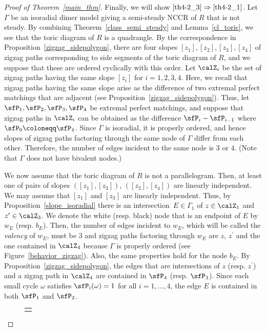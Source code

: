 \begin{proof}[Proof of Theorem~\ref{main_thm}]
Finally, we will show $\eqref{th4-2_3}\Rightarrow\eqref{th4-2_1}$.
Let $\Gamma$ be an isoradial dimer model giving a semi-steady NCCR of $R$ that is not steady. By combining Theorem~\ref{class_semi_steady} and Lemma~\ref{cl_toric}, we see that the toric diagram of $R$ is a quadrangle. By the correspondence in Proposition~\ref{zigzag_sidepolygon}, there are four slopes $[z_1], [z_2],[z_3], [z_4]$ of zigzag paths corresponding to side segments of the toric diagram of $R$, and we suppose that these are ordered cyclically with this order. Let $\calZ_i$ be the set of zigzag paths having the same slope $[z_i]$ for $i=1,2,3,4$. Here, we recall that zigzag paths having the same slope arise as the difference of two extremal perfect matchings that are adjacent (see Proposition~\ref{zigzag_sidepolygon}). Thus, let $\sfP_1,\sfP_2, \sfP_3, \sfP_4$ be extremal perfect matchings, and suppose that zigzag paths in $\calZ_i$ can be obtained as the difference $\sfP_i-\sfP_{i-1}$ where $\sfP_0\coloneqq\sfP_4$. Since $\Gamma$ is isoradial, it is properly ordered, and hence slopes of zigzag paths factoring through the same node of $\Gamma$ differ from each other. Therefore, the number of edges incident to the same node is $3$ or $4$. (Note that $\Gamma$ does not have bivalent nodes.)

We now assume that the toric diagram of $R$ is not a parallelogram. Then, at least one of pairs of slopes $([z_1], [z_3])$, $([z_2], [z_4])$ are linearly independent. We may assume that $[z_1]$ and $[z_3]$ are linearly independent. Thus, by Proposition~\ref{slope_isoradial} there is an intersection~$E\in\Gamma_1$ of $z\in\calZ_1$ and $z^\prime\in\calZ_3$. We denote the white (resp. black) node that is an endpoint of $E$ by $w_E$ (resp. $b_E$). Then, the number of edges incident to $w_E$, which will be called the \emph{valency} of $w_E$, must be $3$ and zigzag paths factoring through $w_E$ are $z$, $z^\prime$ and the one contained in $\calZ_4$ because $\Gamma$ is properly ordered (see Figure~\ref{behavior_zigzag}). Also, the same properties hold for the node $b_E$. By Proposition~\ref{zigzag_sidepolygon}, the edges that are intersections of $z$ (resp. $z^\prime$) and a zigzag path in $\calZ_4$ are contained in $\sfP_4$ (resp. $\sfP_3$). Since each small cycle $\omega$ satisfies $\sfP_i(\omega)=1$ for all $i=1,\dots,4$, the edge $E$ is contained in both $\sfP_1$ and $\sfP_2$.

\begin{figure}[H]
\begin{tabular}{@{}c@{}}
\begin{minipage}{0.5 \hsize}
\begin{center}
{\scalebox{0.7}{
\begin{tikzpicture}
\newcommand{\edgewidth}{0.05cm}
\newcommand{\nodewidth}{0.05cm}
\newcommand{\noderad}{0.16}


\end{tikzpicture}}}
\end{center}
\end{minipage}
\end{tabular}
\end{figure}
\end{proof}
